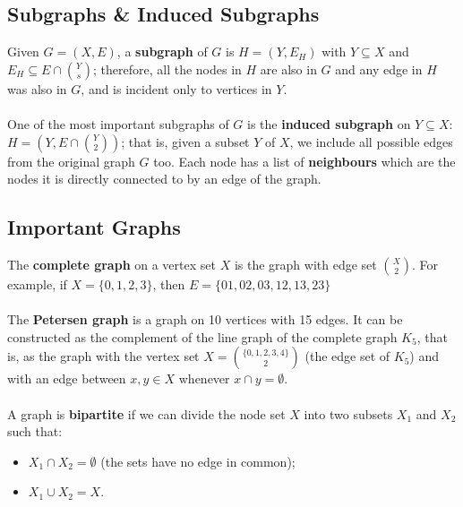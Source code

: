 \documentclass[a4paper,11pt]{article}
\begin{document}
\subsection{Subgraphs \& Induced Subgraphs}
Given $G = (X,E)$, a \textbf{subgraph} of $G$ is $H=(Y, E_H)$ with $Y \subseteq X$ and $E_H \subseteq  E \cap \binom{Y}{s}$;
therefore, all the nodes in $H$ are also in $G$ and any edge in $H$ was also in $G$, and is incident only to vertices in $Y$.
\\\\
One of the most important subgraphs of $G$ is the \textbf{induced subgraph} on $Y \subseteq X$: $H = (Y, E \cap \binom{Y}{2})$;
that is, given a subset $Y$ of $X$, we include all possible edges from the original graph $G$ too.
Each node has a list of \textbf{neighbours} which are the nodes it is directly connected to by an edge of the graph.

\subsection{Important Graphs}
The \textbf{complete graph} on a vertex set $X$ is the graph with edge set $\binom{X}{2}$.
For example, if $X = \{0,1,2,3 \}$, then $E = \{01,02,03,12,13,23\}$
\\\\
The \textbf{Petersen graph} is a graph on 10 vertices with 15 edges.
It can be constructed as the complement of the line graph of the complete graph $K_5$, that is, as the graph with the vertex set $X = \binom{ \{0,1,2,3,4\} }{2}$ (the edge set of $K_5$) and with an edge between $x,y \in X$ whenever $x \cap y = \emptyset$.
\\\\
A graph is \textbf{bipartite} if we can divide the node set $X$ into two subsets $X_1$ and $X_2$ such that:
\begin{itemize}
    \item   $X_1 \cap X_2 = \emptyset$  (the sets have no edge in common);
    \item   $X_1 \cup X_2 = X$.
\end{itemize}
\end{document}
